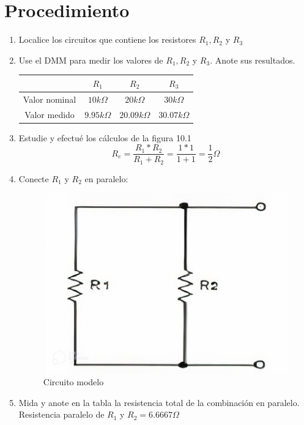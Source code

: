 \section{Procedimiento}
\begin{enumerate}
	\item Localice los circuitos que contiene los resistores $R_{1}, R_{2}$ y $R_{3}$
	\item Use el DMM para medir los valores de  $R_{1}, R_{2}$ y $R_{3}$. Anote sus resultados.
	\begin{table}[h]
		\centering
		\begin{tabular}{|c|c|c|c|}
			\hline
			&$R_{1}$&$R_{2}$&$R_{3}$\\
			\hline
			Valor nominal&$10k\Omega$&$20k\Omega$&$30k\Omega$\\
			\hline
			Valor medido&$9.95k\Omega$&$20.09k\Omega$&$30.07k\Omega$\\
			\hline
		\end{tabular}
	\end{table}
	\item 	Estudie y efectué los cálculos de la figura 10.1 
	\begin{equation*}
		R_{e}= \frac{R_{1}*R_{2}}{R_{1}+R_{2}} = \frac{1*1}{1+1}= \frac{1}{2}\Omega
	\end{equation*}
	\item Conecte $R_{1}$ y $R_{2}$ en paralelo: 
	\begin{figure}[h]
		\centering
		\includegraphics[scale=0.5]{imagenes/5.4}
		\caption{Circuito modelo}
	\end{figure}
	\item Mida y anote en la tabla la resistencia total de la combinación en paralelo.
	\\
	Resistencia paralelo de $R_{1}$ y $R_{2}=6.6667\Omega$

\end{enumerate}
